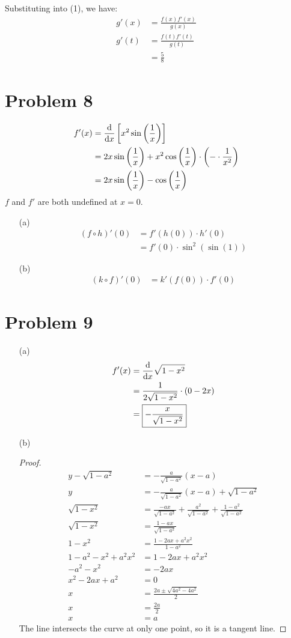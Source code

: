 \documentclass{article}
\newcommand*{\paren}[1]{\ensuremath\left(#1\right)}
\newcommand*{\problem}[1]{\section*{Problem #1}}
\newcommand*{\deriv}[1][x]{\ensuremath{\dfrac{\mathrm{d}}{\mathrm{d}#1}}}
\newcommand*{\Deriv}[2][x]{\ensuremath{\dfrac{\mathrm{d}}{\mathrm{d}#1}\left[#2\right]}}
\begin{document}
Substituting into (1), we have:
\begin{align*}
	g'(x)&=\frac{f(x)f'(x)}{g(x)} \tag{1} \\
	g'(t)&=\frac{f(t)f'(t)}{g(t)} \\
	&=\boxed{\frac{5}{8}}
\end{align*}

\problem{8}
\begin{align*}
	f'(x)&=\Deriv{x^2\sin\paren{\frac{1}{x}}} \\
	&=2x\sin\paren{\frac{1}{x}}+x^2\cos\paren{\frac{1}{x}}\cdot\paren{-\cdot\frac{1}{x^2}} \\
	&=2x\sin\paren{\frac{1}{x}}-\cos\paren{\frac{1}{x}}
\end{align*}
$f$ and $f'$ are both undefined at $x=0$.

\begin{itemize}
	\item[(a)]
	\begin{align*}
		(f\circ h)'(0)&=f'(h(0))\cdot h'(0) \\
		&=f'(0)\cdot\sin^2(\sin(1))
	\end{align*}

	\item[(b)]
	\begin{align*}
		(k\circ f)'(0)&=k'(f(0))\cdot f'(0)
	\end{align*}
\end{itemize}

\problem{9}
\begin{itemize}
	\item[(a)]
	\begin{align*}
		f'(x)&=\deriv\sqrt{1-x^2} \\
		&=\frac{1}{2\sqrt{1-x^2}}\cdot\paren{0-2x} \\
		&=\boxed{-\frac{x}{\sqrt{1-x^2}}}
	\end{align*}

	\item[(b)]
	\begin{proof}
		\begin{align*}
			y-\sqrt{1-a^2}&=-\frac{a}{\sqrt{1-a^2}}(x-a) \\
			y&=-\frac{a}{\sqrt{1-a^2}}(x-a)+\sqrt{1-a^2} \\
			\sqrt{1-x^2}&=\frac{-ax}{\sqrt{1-a^2}}+\frac{a^2}{\sqrt{1-a^2}}+\frac{1-a^2}{\sqrt{1-a^2}} \\
			\sqrt{1-x^2}&=\frac{1-ax}{\sqrt{1-a^2}} \\
			1-x^2&=\frac{1-2ax+a^2x^2}{1-a^2} \\
			1-a^2-x^2+a^2x^2&=1-2ax+a^2x^2 \\
			-a^2-x^2&=-2ax \\
			x^2-2ax+a^2&=0 \\
			x&=\frac{2a\pm\sqrt{4a^2-4a^2}}{2} \\
			x&=\frac{2a}{2} \\
			x&=a
		\end{align*}
		The line intersects the curve at only one point, so it is a tangent line.
	\end{proof}
\end{itemize}
\end{document}
